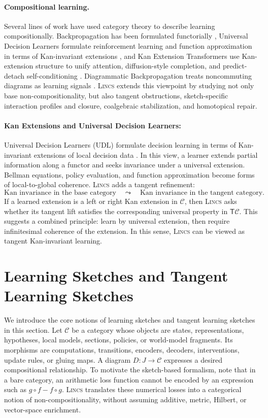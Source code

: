 \documentclass{article}
\newcommand{\C}{\mathcal{C}}
\newcommand{\T}{\mathsf{T}}
\begin{document}
\paragraph{Compositional learning.}
Several lines of work have used category theory to describe learning compositionally. Backpropagation has been formulated functorially \citep{fong2019backprop}, Universal Decision Learners formulate reinforcement learning and function approximation in terms of Kan-invariant extensions \citep{mahadevan2026udl}, and Kan Extension Transformers use Kan-extension structure to unify attention, diffusion-style completion, and predict-detach self-conditioning \citep{mahadevan2026ket}. Diagrammatic Backpropagation treats noncommuting diagrams as learning signals \citep{mahadevan2026catagi}. \textsc{Lincs}   extends this viewpoint by studying not only base non-compositionality, but also tangent obstructions, sketch-specific interaction profiles and closure, coalgebraic stabilization, and homotopical repair.

\paragraph{Kan Extensions and Universal Decision Learners:}
Universal Decision Learners (UDL) formulate decision learning in terms of Kan-invariant extensions of local decision data \citep{mahadevan2026udl}. In this view, a learner extends partial information along a functor and seeks invariance under a universal extension. Bellman equations, policy evaluation, and function approximation become forms of local-to-global coherence. \textsc{Lincs}   adds a tangent refinement:
\[
\text{Kan invariance in the base category}
\quad\leadsto\quad
\text{Kan invariance in the tangent category}.
\]
If a learned extension is a left or right Kan extension in \(\C\), then \textsc{Lincs}   asks whether its tangent lift satisfies the corresponding universal property in \(\T\C\). This suggests a combined principle: learn by universal extension, then require infinitesimal coherence of the extension.
In this sense, \textsc{Lincs}   can be viewed as tangent Kan-invariant learning.


\section{Learning Sketches and Tangent Learning Sketches}
We introduce the core notions of learning sketches and tangent learning sketches in this section.  Let \(\C\) be a category whose objects are states, representations, hypotheses, local models, sections, policies, or world-model fragments. Its morphisms are computations, transitions, encoders, decoders, interventions, update rules, or gluing maps. A diagram \(D:J\to\C\) expresses a desired compositional relationship. To motivate the sketch-based formalism, note that in a bare category, an arithmetic loss function cannot be encoded by an expression such as \(g\circ f-f\circ g\). \textsc{Lincs}   translates these numerical losses into a categorical notion of non-compositionality,  without assuming additive, metric, Hilbert, or vector-space enrichment.
\end{document}
